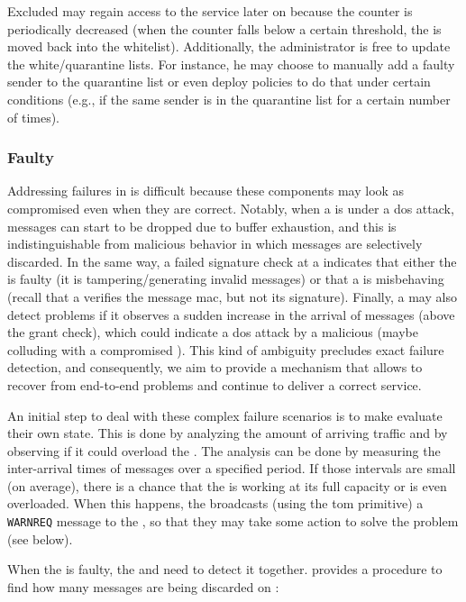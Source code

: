 Excluded \senders may regain access to the service later on because the counter is periodically decreased (when the counter falls below a certain threshold, the \sender is moved back into the whitelist). 
Additionally, the administrator is free to update the white/quarantine lists. 
For instance, he may choose to manually add a faulty sender to the quarantine list or even deploy policies to do that under certain conditions (e.g., if the same sender is in the quarantine list for a certain number of times).


\subsubsection{Faulty \Presieve}
\label{faultypresieve}


Addressing failures in \presieves is difficult because these components may look as compromised even when they are correct.
Notably, when a \presieve is under a \gls{dos} attack, messages can start to be dropped due to buffer exhaustion, and this is indistinguishable from malicious behavior in which messages are selectively discarded.
In the same way, a failed signature check at a \repsieve indicates that either the \presieve is faulty (it is tampering/generating invalid messages) or that a \sender is misbehaving (recall that a \presieve verifies the message \gls{mac}, but not its signature).
Finally, a \repsieve may also detect problems if it observes a sudden increase in the arrival of messages (above the grant check), which could indicate a \gls{dos} attack by a malicious \presieve (maybe colluding with a compromised \sender).
This kind of ambiguity precludes exact failure detection, and consequently, we aim to provide a mechanism that allows \sieveq to recover from end-to-end problems and continue to deliver a correct service.

An initial step to deal with these complex failure scenarios is to make \presieves evaluate their own state.
This is done by analyzing the amount of arriving traffic and by observing if it could overload the \presieve.
The analysis can be done by measuring the inter-arrival times of messages over a specified period.
If those intervals are small (on average), there is a chance that the \presieve is working at its full capacity or is even overloaded.
When this happens, the \presieve broadcasts (using the \gls{tom} primitive) a \texttt{WARNREQ} message to the \repsieves, so that they may take some action to solve the problem (see below).


When the \presieve is faulty, the \sender and \repsieves need to detect it together.
\sieveq provides a procedure to find how many messages are being discarded on \presieve:


